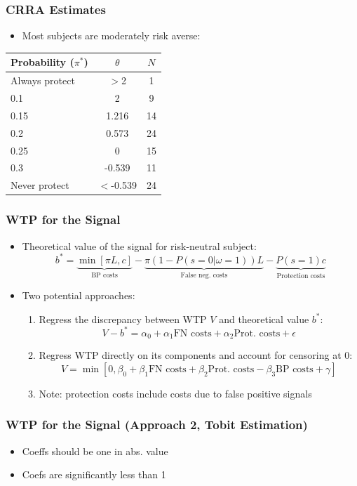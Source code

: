 \documentclass[11pt,hyperref={bookmarks=false}]{beamer}
\begin{document}
\begin{frame}
\frametitle{CRRA Estimates}
\begin{itemize}
\item Most subjects are moderately risk averse: 
\end{itemize}
\begin{table}[htbp]\centering

\begin{tabular}{l c c}
\hline\hline
Probability ($\pi^*$) &                $\theta$ & $N$\\
\hline
Always protect & $>$2 &   1 \\
0.1 & 2 & 9 \\
0.15 & 1.216 & 14 \\
0.2 & 0.573 & 24 \\
0.25 & 0 & 15 \\
0.3 & -0.539 & 11 \\
Never protect & $<$-0.539 &  24 \\
\hline
\end{tabular}
\end{table}
\end{frame}


\begin{frame}
\frametitle{WTP for the Signal}
\begin{itemize}
\item Theoretical value of the signal for risk-neutral subject:
$$b^*=\underbrace{\min[\pi L,c]}_{\text{BP costs}}-\underbrace{\pi(1-P(s=0|\omega=1))L}_{\text{False neg. costs}}-\underbrace{P(s=1)c}_{\text{Protection costs}}$$
\item Two potential approaches:
\begin{enumerate}
\item Regress the discrepancy between WTP $V$ and theoretical value $b^*$:
$$V-b^*=\alpha_0+\alpha_1\text{FN costs}+\alpha_2 \text{Prot. costs}+\epsilon$$
\item Regress WTP directly on its components and account for censoring at 0:
$$V=\min[0,\beta_0+\beta_1\text{FN costs}+\beta_2 \text{Prot. costs}-\beta_3\text{BP costs}+\gamma]$$
\item Note: protection costs include costs due to false positive signals
\end{enumerate}
\end{itemize}

\end{frame}


\begin{frame}
\frametitle{WTP for the Signal (Approach 2, Tobit Estimation)}
\begin{itemize}
\item Coeffs should be one in abs. value
\item Coefs are significantly less than 1
\end{itemize}
\footnotesize

\normalsize
\end{frame}
\end{document}
